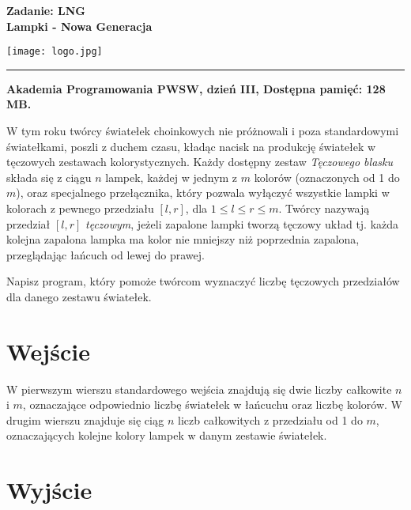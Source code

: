 \documentclass[10pt]{article}
\begin{document}
    

    \noindent
    \begin{minipage}{0.5\textwidth}
        \LARGE{\textsf{\textbf{Zadanie: LNG\\Lampki - Nowa Generacja}}}
    \end{minipage}
    \begin{minipage}{0.5\textwidth}
        \begin{flushright}
            \texttt{[image: logo.jpg]}
        \end{flushright}
    \end{minipage}
    
    \noindent\rule{\textwidth}{0.4pt}
    
    \noindent\textbf{Akademia Programowania PWSW, dzień III, Dostępna pamięć: 128 MB.}
    \vspace{1em}
    
    
    \noindent
    W tym roku twórcy światełek choinkowych nie próżnowali i poza standardowymi światełkami, poszli z duchem czasu, kładąc nacisk na produkcję światełek w tęczowych zestawach kolorystycznych. Każdy dostępny zestaw \textit{Tęczowego blasku} składa się z ciągu $n$ lampek, każdej w jednym z $m$ kolorów (oznaczonych od 1 do $m$), oraz specjalnego przełącznika, który pozwala wyłączyć wszystkie lampki w kolorach z pewnego przedziału $[l, r]$, dla $1\leq l \leq r \leq m$. Twórcy nazywają przedział $[l, r]$ \textit{tęczowym}, jeżeli zapalone lampki tworzą tęczowy układ tj. każda kolejna zapalona lampka ma kolor nie mniejszy niż poprzednia zapalona, przeglądając łańcuch od lewej do prawej.
    
    Napisz program, który pomoże twórcom wyznaczyć liczbę tęczowych przedziałów dla danego zestawu światełek.
    

    \section*{Wejście}
    
    W pierwszym wierszu standardowego wejścia znajdują się dwie liczby całkowite $n$ i $m$, oznaczające odpowiednio liczbę światełek w łańcuchu oraz liczbę kolorów. W drugim wierszu znajduje się ciąg $n$ liczb całkowitych z przedziału od 1 do $m$, oznaczających kolejne kolory lampek w danym zestawie światełek.


    \section*{Wyjście}
    
\end{document}
